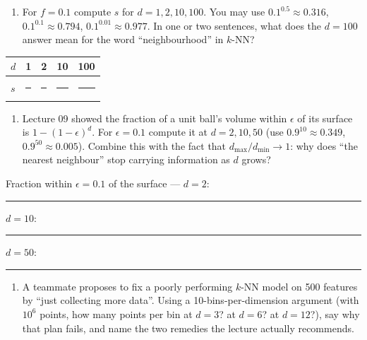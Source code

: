 \documentclass[
  11pt,
]{article}
\newcounter{none} %
\providecommand{\tightlist}{%
  \setlength{\itemsep}{0pt}\setlength{\parskip}{0pt}}
\newcommand{\answerspace}[1]{\par\vspace*{#1}}  %
\newcommand{\blank}[1][1.2in]{\rule{#1}{0.4pt}}
\begin{document}
\answerspace{1.8in}

\begin{enumerate}
\def\labelenumi{(\alph{enumi})}
\setcounter{enumi}{1}
\tightlist
\item
  For \(f = 0.1\) compute \(s\) for \(d = 1, 2, 10, 100\). You may use
  \(0.1^{0.5} \approx 0.316\), \(0.1^{0.1} \approx 0.794\),
  \(0.1^{0.01} \approx 0.977\). In one or two sentences, what does the
  \(d = 100\) answer mean for the word ``neighbourhood'' in \(k\)-NN?
\end{enumerate}

{\def\LTcaptype{none} %
\begin{longtable}[]{@{}lllll@{}}
\toprule\noalign{}
\(d\) & 1 & 2 & 10 & 100 \\
\midrule\noalign{}
\endhead
\bottomrule\noalign{}
\endlastfoot
\(s\) & \blank[0.8in] & \blank[0.8in] & \blank[0.8in] & \blank[0.8in] \\
\end{longtable}
}

\answerspace{1.2in}

\begin{enumerate}
\def\labelenumi{(\alph{enumi})}
\setcounter{enumi}{2}
\tightlist
\item
  Lecture 09 showed the fraction of a unit ball's volume within
  \(\epsilon\) of its surface is \(1 - (1-\epsilon)^d\). For
  \(\epsilon = 0.1\) compute it at \(d = 2, 10, 50\) (use
  \(0.9^{10} \approx 0.349\), \(0.9^{50} \approx 0.005\)). Combine this
  with the fact that \(d_{\max}/d_{\min} \to 1\): why does ``the nearest
  neighbour'' stop carrying information as \(d\) grows?
\end{enumerate}

Fraction within \(\epsilon = 0.1\) of the surface --- \(d = 2\):
\blank[0.8in]\quad \(d = 10\): \blank[0.8in]\quad \(d = 50\):
\blank[0.8in]

\answerspace{1.8in}

\begin{enumerate}
\def\labelenumi{(\alph{enumi})}
\setcounter{enumi}{3}
\tightlist
\item
  A teammate proposes to fix a poorly performing \(k\)-NN model on 500
  features by ``just collecting more data''. Using a
  10-bins-per-dimension argument (with \(10^6\) points, how many points
  per bin at \(d = 3\)? at \(d = 6\)? at \(d = 12\)?), say why that plan
  fails, and name the two remedies the lecture actually recommends.
\end{enumerate}
\end{document}
